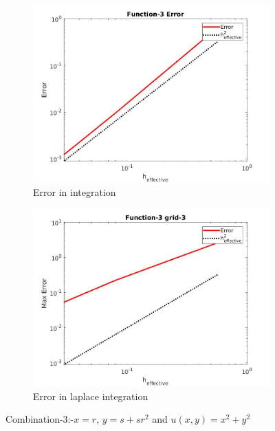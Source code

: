 \documentclass{article}
\begin{document}
\begin{figure}
    \bigskip
    \begin{subfigure}{\textwidth}
    \centering
    \includegraphics[scale=0.33]{error-in-3.jpg}
    \caption{Error in integration}
    \label{fig:doc2}
    \end{subfigure}
    \bigskip
    \begin{subfigure}{\textwidth}
    \centering
    \includegraphics[scale=0.33]{error-inlaplace3.jpg}
    \caption{Error in laplace integration}
    \label{fig:doc3}
    \end{subfigure}
    
\caption{Combination-3:-$x=r$, $y=s+sr^2$ and $u(x,y)=x^2+y^2$}
\end{figure}
\newpage
 
\end{document}
